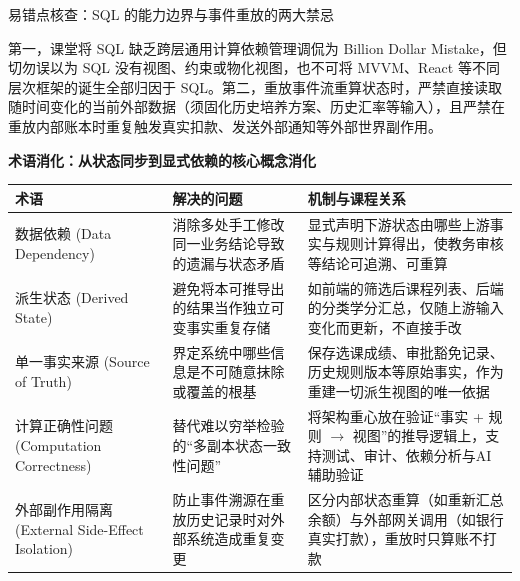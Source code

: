 \documentclass[UTF8,a4paper,11pt,fontset=fandol]{ctexart}
\begin{document}
\begin{warningbox}{易错点核查：SQL 的能力边界与事件重放的两大禁忌}

第一，课堂将 SQL 缺乏跨层通用计算依赖管理调侃为 Billion Dollar Mistake，但切勿误以为 SQL 没有视图、约束或物化视图，也不可将 MVVM、React 等不同层次框架的诞生全部归因于 SQL。第二，重放事件流重算状态时，严禁直接读取随时间变化的当前外部数据（须固化历史培养方案、历史汇率等输入），且严禁在重放内部账本时重复触发真实扣款、发送外部通知等外部世界副作用。

\end{warningbox}

\par{}\textbf{术语消化：从状态同步到显式依赖的核心概念消化}

\begin{center}\small\begin{tabularx}{\linewidth}{YYY}

\toprule

术语 & 解决的问题 & 机制与课程关系\\\midrule

数据依赖 (Data Dependency) & 消除多处手工修改同一业务结论导致的遗漏与状态矛盾 & 显式声明下游状态由哪些上游事实与规则计算得出，使教务审核等结论可追溯、可重算\\[3pt]

派生状态 (Derived State) & 避免将本可推导出的结果当作独立可变事实重复存储 & 如前端的筛选后课程列表、后端的分类学分汇总，仅随上游输入变化而更新，不直接手改\\[3pt]

单一事实来源 (Source of Truth) & 界定系统中哪些信息是不可随意抹除或覆盖的根基 & 保存选课成绩、审批豁免记录、历史规则版本等原始事实，作为重建一切派生视图的唯一依据\\[3pt]

计算正确性问题 (Computation Correctness) & 替代难以穷举检验的“多副本状态一致性问题” & 将架构重心放在验证“事实 + 规则 \ensuremath{\rightarrow} 视图”的推导逻辑上，支持测试、审计、依赖分析与AI辅助验证\\[3pt]

外部副作用隔离 (External Side-Effect Isolation) & 防止事件溯源在重放历史记录时对外部系统造成重复变更 & 区分内部状态重算（如重新汇总余额）与外部网关调用（如银行真实打款），重放时只算账不打款\\[3pt]

\bottomrule\end{tabularx}\end{center}
\end{document}
